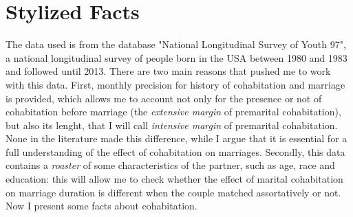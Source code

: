 \documentclass[12pt]{article}
\begin{document}
\section{Stylized Facts}
 The data used is from the database "National Longitudinal Survey of Youth 97", a national longitudinal survey of people born in the USA between 1980 and 1983 and followed until 2013. There are two main reasons that pushed me to work with this data. First, monthly precision for history of cohabitation and marriage is provided, which allows me to account not only for the presence or not of cohabitation before marriage (the \textit{extensive margin} of premarital cohabitation), but also its lenght, that I will call \textit{intensive margin} of premarital cohabitation. None in the literature made this difference, while I argue that it is essential for a full understanding of the effect of cohabitation on marriages. Secondly, this data contains a \textit{roaster} of some characteristics of the partner, such as age, race and education: this will allow me to check whether the effect of marital cohabitation on marriage duration is different when the couple matched assortatively or not.
 Now I present some facts about cohabitation.
 \\
\end{document}
